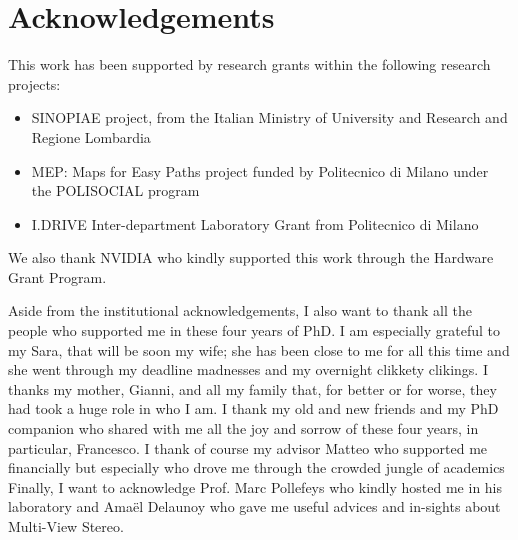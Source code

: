  \chapter*{Acknowledgements}
 
 This work has been supported by research grants within the following research projects:
\begin{itemize}
 \item[] SINOPIAE project, from the Italian Ministry of University and Research and Regione Lombardia
 \item[] MEP: Maps for Easy Paths project funded by Politecnico di Milano under the POLISOCIAL program
 \item[] I.DRIVE Inter-department Laboratory Grant from Politecnico di Milano
\end{itemize}
We also thank NVIDIA who kindly supported this work through the Hardware Grant Program.


\bigskip 



Aside from the institutional acknowledgements, I also want to thank all the people who supported me in these four years of PhD. 
I am especially grateful to my Sara, that will be soon my wife; she has been close to me for all this time and she went through my deadline madnesses and my overnight clikkety clikings.
I thanks my mother,  Gianni, and all my family that, for better or for worse, they had took a huge role in who I am.
I thank my old and new friends and my PhD companion who shared with me all the joy and sorrow of these four years, in particular, Francesco.  
I thank of course my advisor Matteo who supported me financially but especially who drove me through the crowded jungle of academics
Finally, I want to acknowledge Prof. Marc Pollefeys who kindly hosted me in his laboratory and Amaël Delaunoy who gave me useful advices and in-sights about Multi-View Stereo.

